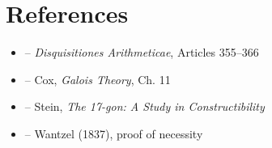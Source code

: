 \section{References}

\begin{itemize}
    \item \cite{gauss-disq} -- \textit{Disquisitiones Arithmeticae}, Articles 355--366
    \item \cite{cox-galois} -- Cox, \textit{Galois Theory}, Ch. 11
    \item \cite{stein-17gon} -- Stein, \textit{The 17-gon: A Study in Constructibility}
    \item \cite{wantzel} -- Wantzel (1837), proof of necessity
\end{itemize}